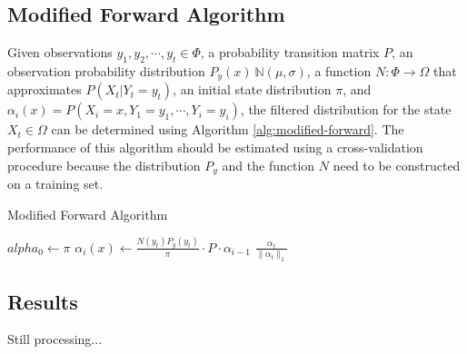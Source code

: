 \documentclass{article}
\begin{document}
\subsection{Modified Forward Algorithm}
Given observations $y_1, y_2, \cdots, y_t \in \Phi$, a probability transition matrix $P$, an observation probability distribution $P_y(x) ~ \mathbb{N}(\mu,\sigma)$, a function $N: \Phi \to \Omega$ that approximates $P(X_t | Y_t = y_t)$, an initial state distribution $\pi$, and $\alpha_i(x) = P(X_i = x, Y_1 = y_1, \cdots, Y_i = y_i)$, the filtered distribution for the state $X_t \in \Omega$ can be determined using Algorithm \ref{alg:modified-forward}.
The performance of this algorithm should be estimated using a cross-validation procedure because the distribution $P_y$ and the function $N$ need to be constructed on a training set.
\begin{algorithm}
\caption{Modified Forward Algorithm}
\label{alg:modified-forward}
\begin{algorithmic}
\STATE $alpha_0 \leftarrow \pi$
\STATE $\alpha_i(x) \leftarrow \frac{N(y_t) P_y(y_t)}{\pi} \cdot P \cdot \alpha_{i-1}$
\ENDFOR
\RETURN $\frac{\alpha_t}{\|\alpha_t\|_1}$
\end{algorithmic}
\end{algorithm}

\subsection{Results}
Still processing...


\nocite{Russell:2009:AIM:1671238}
\nocite{viterbi1967error}
\nocite{Richard1991}
{}
\end{document}
